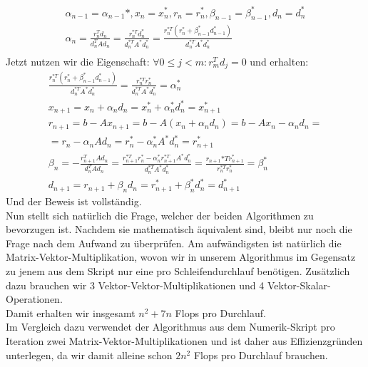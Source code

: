 \begin{align*}
  \alpha_{n-1} = \alpha_{n-1}*, x_n = x_n^*, r_n = r_n^*, \beta_{n-1} = \beta_{n-1}^*, d_n = d_n^* \\
  \alpha_n = \frac{r_n^Td_n}{d_n^TAd_n} = \frac{r_n^{*T}d_n^*}{d_n^{*T}A^*d_n^*} = \frac{r_n^{*T}(r_n^* + \beta_{n-1}^*d_{n-1}^*)}{d_n^{*T}A^*d_n^*} \\
\end{align*}
Jetzt nutzen wir die Eigenschaft: $\forall 0 \leq j < m: r_m^Td_j = 0$ und erhalten:
\begin{align*}
  \frac{r_n^{*T}(r_n^* + \beta_{n-1}^*d_{n-1}^*)}{d_n^{*T}A^*d_n^*} = \frac{r_n^{*T}r_n^*}{d_n^{*T}A^*d_n^*} = \alpha_n^* \\
  x_{n+1} = x_n + \alpha_nd_n = x_n^* + \alpha_n^*d_n^* = x_{n+1}^* \\
  r_{n+1} = b - Ax_{n+1} = b - A(x_n + \alpha_nd_n) = b - Ax_n - \alpha_nd_n = \\
  = r_n - \alpha_nAd_n = r_n^* - \alpha_n^*A^*d_n^* = r_{n+1}^* \\
  \beta_n = - \frac{r_{n+1}^TAd_n}{d_n^TAd_n} = \frac{r_{n+1}^{*T}r_n^* - \alpha_n^*r_{n+1}^{*T}A^*d_n^*}{d_n^{*T}A^*d_n^*}
  = \frac{r_{n+1}{*T}r_{n+1}^*}{r_n^{*T}r_n^*} = \beta_n^* \\
  d_{n+1} = r_{n+1} + \beta_nd_n = r_{n+1}^* + \beta_n^*d_n^* = d_{n+1}^*
\end{align*}
Und der Beweis ist vollständig. \\

Nun stellt sich natürlich die Frage, welcher der beiden Algorithmen zu bevorzugen ist.
Nachdem sie mathematisch äquivalent sind, bleibt nur noch die Frage nach dem Aufwand zu überprüfen.
Am aufwändigsten ist natürlich die Matrix-Vektor-Multiplikation, wovon wir in unserem Algorithmus
im Gegensatz zu jenem aus dem Skript nur eine pro Schleifendurchlauf benötigen.
Zusätzlich dazu brauchen wir 3 Vektor-Vektor-Multiplikationen und 4 Vektor-Skalar-Operationen. \\
Damit erhalten wir insgesamt $n^2+7n$ Flops pro Durchlauf. \\
Im Vergleich dazu verwendet der Algorithmus aus dem Numerik-Skript pro Iteration zwei Matrix-Vektor-Multiplikationen
und ist daher aus Effizienzgründen unterlegen, da wir damit alleine schon $2n^2$ Flops pro Durchlauf brauchen. \\

